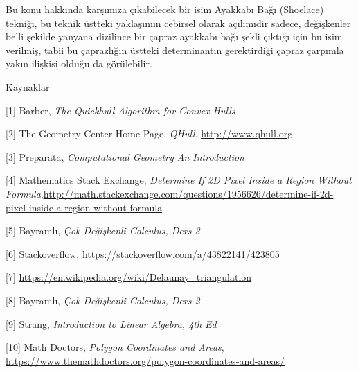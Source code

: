 \documentclass[12pt,fleqn]{article}\usepackage{../../common}
\begin{document}
Bu konu hakkında karşımıza çıkabilecek bir isim Ayakkabı Bağı (Shoelace)
tekniği, bu teknik üstteki yaklaşımın cebirsel olarak açılımıdir sadece,
değişkenler belli şekilde yanyana dizilince bir çapraz ayakkabı bağı şekli
çıktığı için bu isim verilmiş, tabii bu çaprazlığın üstteki determinantın
gerektirdiği çapraz çarpımla yakın ilişkisi olduğu da görülebilir.

Kaynaklar 

[1] Barber, {\em The Quickhull Algorithm for Convex Hulls}

[2] The Geometry Center Home Page, {\em QHull}, \url{http://www.qhull.org}

[3] Preparata, {\em Computational Geometry An Introduction}

[4] Mathematics Stack Exchange, {\em Determine If 2D Pixel Inside a Region Without Formula},\url{http://math.stackexchange.com/questions/1956626/determine-if-2d-pixel-inside-a-region-without-formula}

[5] Bayramlı, {\em Çok Değişkenli Calculus, Ders 3}

[6] Stackoverflow, \url{https://stackoverflow.com/a/43822141/423805}

[7] \url{https://en.wikipedia.org/wiki/Delaunay_triangulation}

[8] Bayramlı, {\em Çok Değişkenli Calculus, Ders 2}

[9] Strang, {\em Introduction to Linear Algebra, 4th Ed}

[10] Math Doctors, {\em Polygon Coordinates and Areas},
     \url{https://www.themathdoctors.org/polygon-coordinates-and-areas/}
\end{document}
